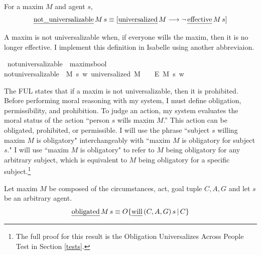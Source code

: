 \begin{isabellebody}
\begin{isamarkuptext}
\begin{definition}
For a maxim $M$ and agent $s$,
$$\text{\emph{not\_universalizable}} \, M \, s  \equiv [ \text{\emph{universalized}} \, M \longrightarrow \neg \, \text{\emph{effective}} \, M \, s ]$$
\end{definition}
\noindent A maxim is not universalizable when, if everyone wills the maxim, then it is no longer effective.
I implement this definition in Isabelle using another abbreviaion.%
\end{isamarkuptext}\isamarkuptrue%
\isamarkupfalse%
\ not{\isacharunderscore}universalizable\ {\isacharcolon}{\isacharcolon}\ {\isachardoublequoteopen}maxim{\isasymRightarrow}s{\isasymRightarrow}bool{\isachardoublequoteclose}\ \ \isanewline
{\isachardoublequoteopen}not{\isacharunderscore}universalizable\ {\isasymequiv}\ {\isasymlambda}M\ s{\isachardot}\ {\isasymforall}w{\isachardot}\ {\isacharparenleft}{\isacharparenleft}universalized\ M{\isacharparenright}\ \ \isactrlbold {\isasymrightarrow}\ {\isacharparenleft}\isactrlbold {\isasymnot}\ {\isacharparenleft}E\ M\ s{\isacharparenright}{\isacharparenright}{\isacharparenright}\ w{\isachardoublequoteclose}\isanewline
%
%
\begin{isamarkuptext}%
The FUL states that if a maxim is not universalizable, then it is prohibited. Before performing
moral reasoning with my system, I must define obligation, permissibility, and prohibition.
To judge an action, my system evaluates the moral status of the action 
``person $s$ wills maxim $M$.'' This action can be obligated, prohibited, or permissible.
I will use the phrase ``subject $s$ willing maxim $M$ is obligatory" 
interchangeably with ``maxim $M$ is obligatory for subject $s$." I will use ``maxim $M$ is obligatory" to 
refer to $M$ being obligatory for any arbitrary subject, which is equivalent to $M$ being 
obligatory for a specific subject.\footnote{The full proof for this result is the Obligation Universalizes
Across People Test in Section \ref{tests}.}

\begin{definition}[Obligation]

Let maxim $M$ be composed of the circumstances, act, goal tuple $C, A, G$ and let $s$ be an arbitrary agent.
$$\text{\emph{obligated}} \, M \, s \equiv O\{ \text{\emph{will}} \, (C, A, G) \, s \, | \, C\}$$
\end{definition}


\end{isamarkuptext}
\end{isabellebody}
